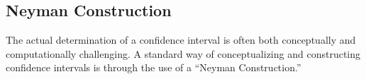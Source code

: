 \subsection{Neyman Construction}

The actual determination of a confidence interval is often both conceptually and computationally challenging.
A standard way of conceptualizing and constructing confidence intervals is through the use of a ``Neyman Construction.''





